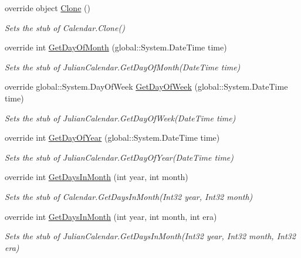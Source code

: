 \begin{DoxyCompactItemize}
override object \hyperlink{class_system_1_1_globalization_1_1_fakes_1_1_stub_julian_calendar_a039c76d612d87d2dad6c5a385f2765a3}{Clone} ()
\begin{DoxyCompactList}\small\item\em Sets the stub of Calendar.\-Clone()\end{DoxyCompactList}\item 
override int \hyperlink{class_system_1_1_globalization_1_1_fakes_1_1_stub_julian_calendar_ab2b902e2f195306b6c08a81681c40b76}{Get\-Day\-Of\-Month} (global\-::\-System.\-Date\-Time time)
\begin{DoxyCompactList}\small\item\em Sets the stub of Julian\-Calendar.\-Get\-Day\-Of\-Month(\-Date\-Time time)\end{DoxyCompactList}\item 
override global\-::\-System.\-Day\-Of\-Week \hyperlink{class_system_1_1_globalization_1_1_fakes_1_1_stub_julian_calendar_ae4f54267b22e6cb05f02997fcfdc58d5}{Get\-Day\-Of\-Week} (global\-::\-System.\-Date\-Time time)
\begin{DoxyCompactList}\small\item\em Sets the stub of Julian\-Calendar.\-Get\-Day\-Of\-Week(\-Date\-Time time)\end{DoxyCompactList}\item 
override int \hyperlink{class_system_1_1_globalization_1_1_fakes_1_1_stub_julian_calendar_a1fc29413d61329297c0ef96c54652050}{Get\-Day\-Of\-Year} (global\-::\-System.\-Date\-Time time)
\begin{DoxyCompactList}\small\item\em Sets the stub of Julian\-Calendar.\-Get\-Day\-Of\-Year(\-Date\-Time time)\end{DoxyCompactList}\item 
override int \hyperlink{class_system_1_1_globalization_1_1_fakes_1_1_stub_julian_calendar_a2fa62afbc331562698d533e9b0c4410d}{Get\-Days\-In\-Month} (int year, int month)
\begin{DoxyCompactList}\small\item\em Sets the stub of Calendar.\-Get\-Days\-In\-Month(\-Int32 year, Int32 month)\end{DoxyCompactList}\item 
override int \hyperlink{class_system_1_1_globalization_1_1_fakes_1_1_stub_julian_calendar_a81edaf59a6c14d7a5d06026b36f6bd46}{Get\-Days\-In\-Month} (int year, int month, int era)
\begin{DoxyCompactList}\small\item\em Sets the stub of Julian\-Calendar.\-Get\-Days\-In\-Month(\-Int32 year, Int32 month, Int32 era)\end{DoxyCompactList}\item 

\end{DoxyCompactItemize}
